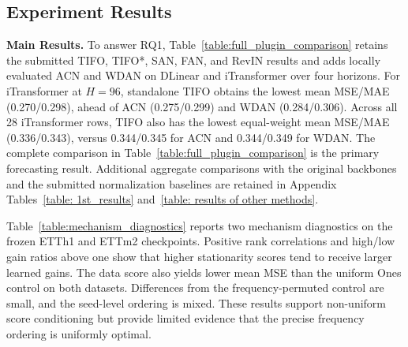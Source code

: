 \documentclass[sigconf,anonymous,review]{acmart}
\newcommand{\resubmitchange}[1]{#1}
\begin{document}


\subsection{Experiment Results}

\textbf{Main Results.}
\resubmitchange{To answer RQ1, Table~\ref{table:full_plugin_comparison} retains
the submitted TIFO, TIFO*, SAN, FAN, and RevIN results and adds locally
evaluated ACN and WDAN on DLinear and iTransformer over four horizons.}
\resubmitchange{For iTransformer at $H=96$, standalone TIFO obtains the lowest
mean MSE/MAE (0.270/0.298), ahead of ACN
(0.275/0.299) and WDAN (0.284/0.306). Across all 28 iTransformer rows, TIFO
also has the lowest equal-weight mean MSE/MAE (0.336/0.343), versus
0.344/0.345 for ACN and 0.344/0.349 for WDAN.}
\resubmitchange{The complete comparison in
Table~\ref{table:full_plugin_comparison} is the primary forecasting result.
Additional aggregate comparisons with the original backbones and the submitted
normalization baselines are retained in Appendix
Tables~\ref{table: 1st_results} and~\ref{table: results of other methods}.}

\resubmitchange{Table~\ref{table:mechanism_diagnostics} reports two mechanism
diagnostics on the frozen ETTh1 and ETTm2 checkpoints. Positive rank
correlations and high/low gain ratios above one show that higher stationarity
scores tend to receive larger learned gains. The data score also yields lower
mean MSE than the uniform Ones control on both datasets. Differences from the
frequency-permuted control are small, and the seed-level ordering is mixed.
These results support non-uniform score conditioning but provide limited
evidence that the precise frequency ordering is uniformly optimal.}
\end{document}
